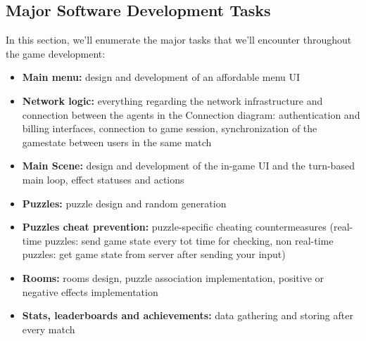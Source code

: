 \subsection{Major Software Development Tasks}
In this section, we'll enumerate the major tasks that we'll encounter throughout the game development:

\begin {itemize}	
	\item \textbf{Main menu:} design and development of an affordable menu UI
	\item \textbf{Network logic: } everything regarding the network infrastructure and connection between the agents in the Connection diagram: authentication and billing interfaces, connection to game session, synchronization of the gamestate between users in the same match
	\item \textbf{Main Scene:}  design and development of the in-game UI and the turn-based main loop, effect statuses and actions
	\item \textbf{Puzzles:}  puzzle design and random generation
	\item \textbf{Puzzles cheat prevention:} puzzle-specific cheating countermeasures (real-time puzzles: send game state every tot time for checking, non real-time puzzles: get game state from server after sending your input) 
	\item \textbf{Rooms:}  rooms design, puzzle association implementation, positive or negative effects implementation
	\item \textbf{Stats, leaderboards and achievements:} data gathering and storing after every match
\end {itemize}


\pagebreak 